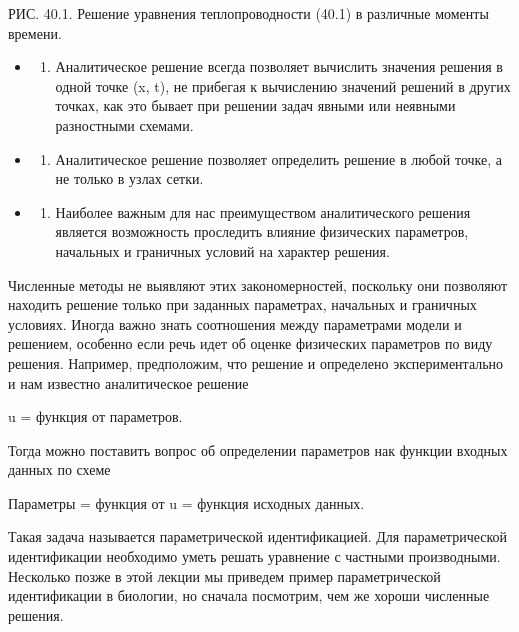 \documentclass[
]{article}
\providecommand{\tightlist}{%
  \setlength{\itemsep}{0pt}\setlength{\parskip}{0pt}}
\begin{document}
{{{РИС. 40.1. Решение уравнения теплопроводности (40.1) в различные моменты
времени.

\begin{itemize}
\tightlist
\item
  \begin{enumerate}
  \def\labelenumi{\arabic{enumi}.}
  \setcounter{enumi}{1}
  \tightlist
  \item
    Аналитическое решение всегда позволяет вычислить значения решения в
    одной точке (x, t), не прибегая к вычислению значений решений в
    других точках, как это бывает при решении задач явными или неявными
    разностными схемами.
  \end{enumerate}
\item
  \begin{enumerate}
  \def\labelenumi{\arabic{enumi}.}
  \setcounter{enumi}{2}
  \tightlist
  \item
    Аналитическое решение позволяет определить решение в любой точке, а
    не только в узлах сетки.
  \end{enumerate}
\item
  \begin{enumerate}
  \def\labelenumi{\arabic{enumi}.}
  \setcounter{enumi}{3}
  \tightlist
  \item
    Наиболее важным для нас преимуществом аналитического решения
    является возможность проследить влияние физических параметров,
    начальных и граничных условий на характер решения.
  \end{enumerate}
\end{itemize}

Численные методы не выявляют этих закономерностей, поскольку они
позволяют находить решение только при заданных параметрах, начальных и
граничных условиях. Иногда важно знать соотношения между параметрами
модели и решением, особенно если речь идет об оценке физических
параметров по виду решения. Например, предположим, что решение и
определено экспериментально и нам известно аналитическое решение

u = функция от параметров.

Тогда можно поставить вопрос об определении параметров нак функции
входных данных по схеме

Параметры = функция от u = функция исходных данных.

Такая задача называется параметрической идентификацией. Для
параметрической идентификации необходимо уметь решать уравнение с
частными производными. Несколько позже в этой лекции мы приведем пример
параметрической идентификации в биологии, но сначала посмотрим, чем же
хороши численные решения.

}}}
\end{document}

